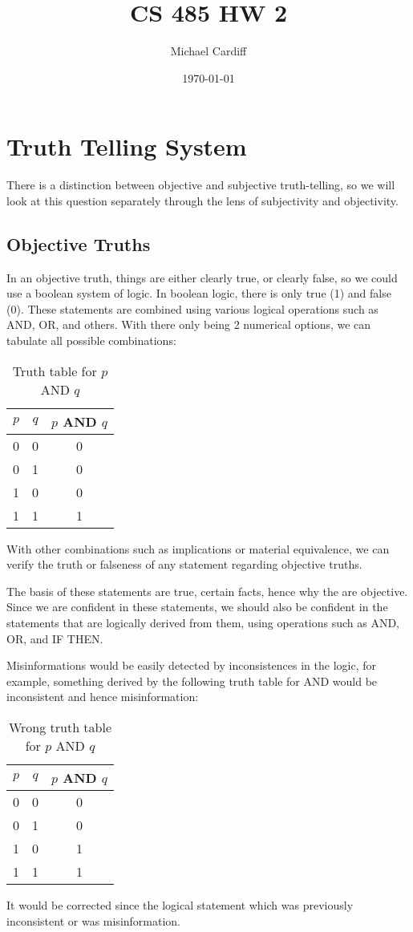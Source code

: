 \documentclass[12pt]{article}
\title{CS 485 HW 2}
\author{Michael Cardiff}
\date{\today}
\begin{document}
\maketitle
\section{Truth Telling System}
There is a distinction between objective and subjective truth-telling, so we will look at this question separately through the lens of subjectivity and objectivity.
\subsection{Objective Truths}
In an objective truth, things are either clearly true, or clearly false, so we could use a boolean system of logic. In boolean logic, there is only true (1) and false (0). These statements are combined using various logical operations such as AND, OR, and others. With there only being 2 numerical options, we can tabulate all possible combinations:
\begin{table}[H]
  \centering
  \begin{tabular}{c|c|c}
    $p$ & $q$ & $p$ AND $q$ \\
    \hline
    0 & 0 & 0 \\
    0 & 1 & 0 \\
    1 & 0 & 0 \\
    1 & 1 & 1
  \end{tabular}
  \caption{Truth table for $p$ AND $q$}
\end{table}
With other combinations such as implications or material equivalence, we can verify the truth or falseness of any statement regarding objective truths.

The basis of these statements are true, certain facts, hence why the are objective. Since we are confident in these statements, we should also be confident in the statements that are logically derived from them, using operations such as AND, OR, and IF THEN.

Misinformations would be easily detected by inconsistences in the logic, for example, something derived by the following truth table for AND would be inconsistent and hence misinformation:
\begin{table}[H]
  \centering
  \begin{tabular}{c|c|c}
    $p$ & $q$ & $p$ AND $q$ \\
    \hline
    0 & 0 & 0 \\
    0 & 1 & 0 \\
    1 & 0 & 1 \\
    1 & 1 & 1
  \end{tabular}
  \caption{Wrong truth table for $p$ AND $q$}
\end{table}
It would be corrected since the logical statement which was previously inconsistent or was misinformation.
\end{document}

